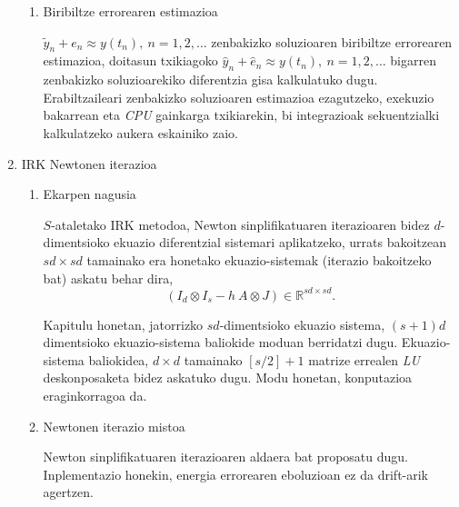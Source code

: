 \begin{enumerate}
\begin{enumerate}
\item Biribiltze errorearen estimazioa

$\tilde{y}_n+e_n \approx y(t_n), \ n=1,2,\dots$ zenbakizko soluzioaren  biribiltze errorearen estimazioa, doitasun txikiagoko $\hat{y}_n+\hat{e}_n \approx y(t_n), \ n=1,2,\dots$ bigarren zenbakizko soluzioarekiko  diferentzia gisa kalkulatuko dugu.
Erabiltzaileari zenbakizko soluzioaren estimazioa ezagutzeko, exekuzio bakarrean  eta \emph{CPU} gainkarga txikiarekin, bi integrazioak sekuentzialki kalkulatzeko aukera eskainiko zaio. 

\end{enumerate}


\item IRK Newtonen iterazioa

\begin{enumerate}
\item Ekarpen nagusia

$S$-ataletako IRK metodoa,  Newton sinplifikatuaren iterazioaren bidez $d$-dimentsioko ekuazio diferentzial  sistemari aplikatzeko, urrats bakoitzean $sd \times sd$ tamainako era honetako ekuazio-sistemak (iterazio bakoitzeko bat) askatu behar dira,
\begin{equation*}
(I_d \otimes I_s- h \ A \otimes J) \in \mathbb{R}^{sd \times sd}.
\end{equation*} 

Kapitulu honetan, jatorrizko $sd$-dimentsioko ekuazio sistema, $(s+1)d$ dimentsioko ekuazio-sistema baliokide moduan berridatzi dugu. Ekuazio-sistema baliokidea,  $d \times d$ tamainako $[s/2]+1$ matrize errealen \emph{LU} deskonposaketa bidez askatuko dugu. Modu honetan, konputazioa eraginkorragoa da.



\item Newtonen iterazio mistoa

Newton sinplifikatuaren iterazioaren aldaera bat proposatu dugu. Inplementazio honekin, energia errorearen eboluzioan ez da drift-arik agertzen. 



\end{enumerate}
  


\end{enumerate}
